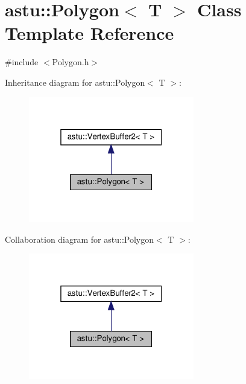\hypertarget{classastu_1_1Polygon}{}\section{astu\+:\+:Polygon$<$ T $>$ Class Template Reference}
\label{classastu_1_1Polygon}


{\ttfamily \#include $<$Polygon.\+h$>$}



Inheritance diagram for astu\+:\+:Polygon$<$ T $>$\+:\nopagebreak
\begin{figure}[H]
\begin{center}
\leavevmode
\includegraphics[width=205pt]{classastu_1_1Polygon__inherit__graph}
\end{center}
\end{figure}


Collaboration diagram for astu\+:\+:Polygon$<$ T $>$\+:\nopagebreak
\begin{figure}[H]
\begin{center}
\leavevmode
\includegraphics[width=205pt]{classastu_1_1Polygon__coll__graph}
\end{center}
\end{figure}
